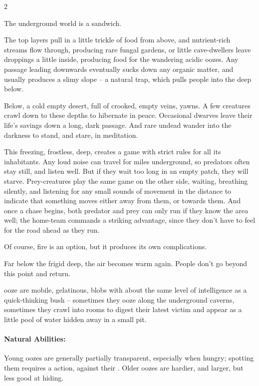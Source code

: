 \begin{multicols}{2}

\noindent
The underground world is a sandwich.

The top layers pull in a little trickle of food from above, and nutrient-rich streams flow through, producing rare fungal gardens, or little cave-dwellers leave droppings a little inside, producing food for the wandering acidic oozes.
Any passage leading downwards eventually sucks down any organic matter, and usually produces a slimy slope -- a natural trap, which pulls people into the \gls{deep} below.

Below, a cold empty desert, full of crooked, empty veins, yawns.
A few creatures crawl down to these depths to hibernate in peace.
Occasional dwarves leave their life's savings down a long, dark passage.
And rare undead wander into the darkness to stand, and stare, in meditation.

This freezing, frostless, \gls{deep}, creates a game with strict rules for all its inhabitants.
Any loud noise can travel for miles underground, so predators often stay still, and listen well.
But if they wait too long in an empty patch, they will starve.
Prey-creatures play the same game on the other side, waiting, breathing silently, and listening for any small sounds of movement in the distance to indicate that something moves either away from them, or towards them.
And once a chase begins, both predator and prey can only run if they know the area well; the home-team commands a striking advantage, since they don't have to feel for the road ahead as they run.

Of course, fire is an option, but it produces its own complications.

Far below the frigid \gls{deep}, the air becomes warm again.
People don't go beyond this point and return.

  {ooze}%
are mobile, gelatinous, blobs with about the same level of intelligence as a quick-thinking bush -- sometimes they ooze along the underground caverns, sometimes they crawl into rooms to digest their latest victim and appear as a little pool of water hidden away in a small pit.

\paragraph{Natural Abilities:} Young oozes are generally partially transparent, especially when hungry; spotting them requires a  action, against their .
Older oozes are hardier, and larger, but less good at hiding.


\end{multicols}
